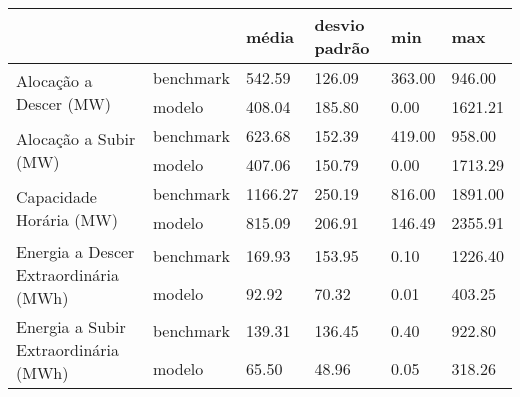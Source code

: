 \begin{tabular}{llllll}
\toprule
 &  & média & desvio padrão & min & max \\
\midrule
\multirow[t]{2}{*}{Alocação a Descer (MW)} & benchmark & 542.59 & 126.09 & 363.00 & 946.00 \\
 & modelo & 408.04 & 185.80 & 0.00 & 1621.21 \\
\cline{1-6}
\multirow[t]{2}{*}{Alocação a Subir (MW)} & benchmark & 623.68 & 152.39 & 419.00 & 958.00 \\
 & modelo & 407.06 & 150.79 & 0.00 & 1713.29 \\
\cline{1-6}
\multirow[t]{2}{*}{Capacidade Horária (MW)} & benchmark & 1166.27 & 250.19 & 816.00 & 1891.00 \\
 & modelo & 815.09 & 206.91 & 146.49 & 2355.91 \\
\cline{1-6}
\multirow[t]{2}{*}{Energia a Descer Extraordinária (MWh)} & benchmark & 169.93 & 153.95 & 0.10 & 1226.40 \\
 & modelo & 92.92 & 70.32 & 0.01 & 403.25 \\
\cline{1-6}
\multirow[t]{2}{*}{Energia a Subir Extraordinária (MWh)} & benchmark & 139.31 & 136.45 & 0.40 & 922.80 \\
 & modelo & 65.50 & 48.96 & 0.05 & 318.26 \\
\cline{1-6}
\bottomrule
\end{tabular}
